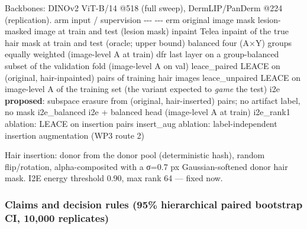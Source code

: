 {Backbones: DINOv2 ViT-B/14 @518 (full sweep), DermLIP/PanDerm @224 (replication).
\textbar{} arm \textbar{} input / supervision \textbar{}
\textbar{} -\/-\/- \textbar{} -\/-\/- \textbar{}
\textbar{} erm \textbar{} original image \textbar{}
\textbar{} mask \textbar{} lesion-masked image at train and test (lesion mask) \textbar{}
\textbar{} inpaint \textbar{} Telea inpaint of the true hair mask at train and test (oracle; upper bound) \textbar{}
\textbar{} balanced \textbar{} four (A×Y) groups equally weighted (image-level A at train) \textbar{}
\textbar{} dfr \textbar{} last layer on a group-balanced subset of the validation fold (image-level A on val) \textbar{}
\textbar{} leace\_paired \textbar{} LEACE on (original, hair-inpainted) pairs of training hair images \textbar{}
\textbar{} leace\_unpaired \textbar{} LEACE on image-level A of the training set (the variant expected to \emph{game} the test) \textbar{}
\textbar{} i2e \textbar{} \textbf{proposed}: subspace erasure from (original, hair-inserted) pairs; no artifact label, no mask \textbar{}
\textbar{} i2e\_balanced \textbar{} i2e + balanced head (image-level A at train) \textbar{}
\textbar{} i2e\_rank1 \textbar{} ablation: LEACE on insertion pairs \textbar{}
\textbar{} insert\_aug \textbar{} ablation: label-independent insertion augmentation (WP3 route 2) \textbar{}

Hair insertion: donor from the donor pool (deterministic hash), random flip/rotation, alpha-composited
with a σ=0.7 px Gaussian-softened donor hair mask. I2E energy threshold 0.90, max rank 64 --- fixed now.

\subsubsection{Claims and decision rules (95\% hierarchical paired bootstrap CI, 10,000 replicates)}\label{claims-and-decision-rules-95-hierarchical-paired-bootstrap-ci-10000-replicates}

\begin{itemize}


\end{itemize}}
